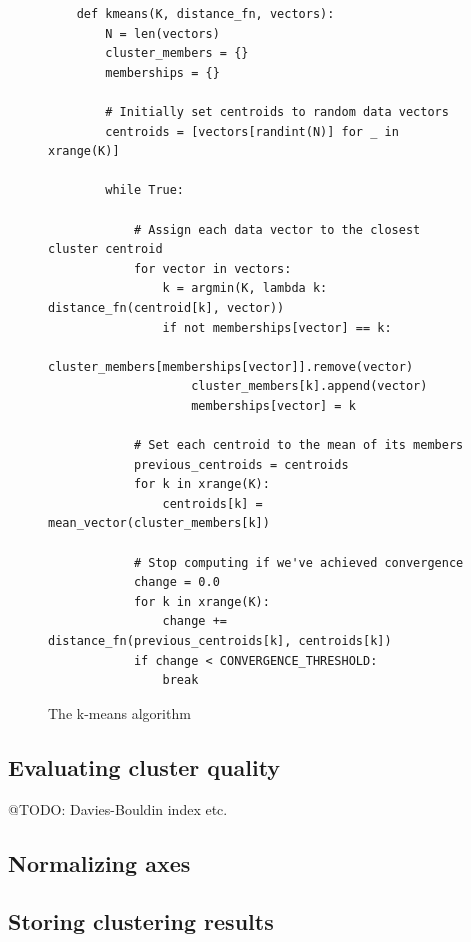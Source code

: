 \begin{figure}[h]
  \begin{verbatim}
    def kmeans(K, distance_fn, vectors):
        N = len(vectors)
        cluster_members = {}
        memberships = {}

        # Initially set centroids to random data vectors
        centroids = [vectors[randint(N)] for _ in xrange(K)]

        while True:

            # Assign each data vector to the closest cluster centroid
            for vector in vectors:
                k = argmin(K, lambda k: distance_fn(centroid[k], vector))
                if not memberships[vector] == k:
                    cluster_members[memberships[vector]].remove(vector)
                    cluster_members[k].append(vector)
                    memberships[vector] = k

            # Set each centroid to the mean of its members
            previous_centroids = centroids
            for k in xrange(K):
                centroids[k] = mean_vector(cluster_members[k])

            # Stop computing if we've achieved convergence
            change = 0.0
            for k in xrange(K):
                change += distance_fn(previous_centroids[k], centroids[k])
            if change < CONVERGENCE_THRESHOLD:
                break
  \end{verbatim}

  \caption{The k-means algorithm}
  \label{fig:k-means}
\end{figure}

\subsection{Evaluating cluster quality}
\label{approach:sub:evaluating_clusters}

\cite{Halkidi2001}

@TODO: Davies-Bouldin index etc.

\subsection{Normalizing axes}
\label{approach:sub:normalizing_axes}

\subsection{Storing clustering results}
\label{approach:sub:storing_results}

